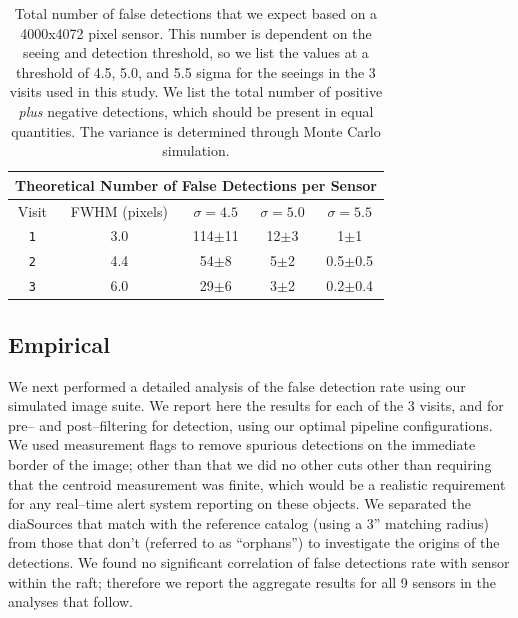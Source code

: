 \documentclass[floatfix, apj]{emulateapj}
\begin{document}
\begin{table}[t]
\centering
\begin{tabular}{ccccc}
\hline
\multicolumn{5}{|c|}{Theoretical Number of False Detections per Sensor} \\
\hline
Visit    & FWHM (pixels) & $\sigma=4.5$ & $\sigma=5.0$ & $\sigma=5.5$\\
\hline
{\tt 1} & 3.0 & 114$\pm$11 & 12$\pm$3& 1$\pm$1\\
{\tt 2} & 4.4 & 54$\pm$8 & 5$\pm$2& 0.5$\pm$0.5\\
{\tt 3} & 6.0 & 29$\pm$6 & 3$\pm$2&0.2$\pm$0.4\\
\end{tabular}
\caption{{\rm Total number of false detections that we expect based on a 4000x4072 pixel sensor.
    This number is dependent on the seeing and detection threshold, so we list the values at a threshold of 4.5, 5.0, and 5.5 sigma for the seeings in the 3 visits used in this study.
    We list the total number of positive {\it plus} negative detections, which should be present in equal quantities.
    The variance is determined through Monte Carlo simulation.\label{tab-fp}}}
\end{table}

\subsection{Empirical}

We next performed a detailed analysis of the false detection rate using our simulated image suite.
We report here the results for each of the 3 visits, and for pre-- and post--filtering for detection, using our optimal pipeline configurations.
We used measurement flags to remove spurious detections on the immediate border of the image; other than that we did no other cuts other than requiring that the centroid measurement was finite, which would be a realistic requirement for any real--time alert system reporting on these objects.
We separated the diaSources that match with the reference catalog (using a 3'' matching radius) from those that don't (referred to as ``orphans'') to investigate the origins of the detections.
We found no significant correlation of false detections rate with sensor within the raft; therefore we report the aggregate results for all 9 sensors in the analyses that follow.
\end{document}
